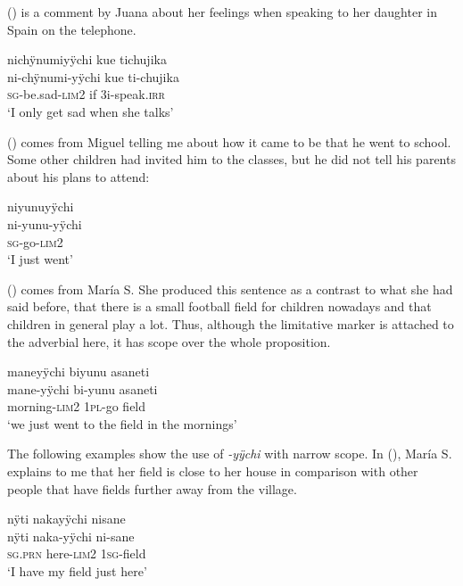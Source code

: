 () is a comment by Juana about her feelings when speaking to her daughter in Spain on the telephone.

\ea\label{ex:lim2-1}
\begingl
\glpreamble nichÿnumiyÿchi kue tichujika\\
\gla ni-chÿnumi-yÿchi kue ti-chujika\\
\textsc{sg}-be.sad-\textsc{lim}2 if 3i-speak.\textsc{irr}\\
\glft ‘I only get sad when she talks’
\endgl
\trailingcitation{[jxx-p120430l-1.307]}
\xe

() comes from Miguel telling me about how it came to be that he went to school. Some other children had invited him to the classes, but he did not tell his parents about his plans to attend:

\ea\label{ex:lim2-4}
\begingl
\glpreamble niyunuyÿchi\\
\gla ni-yunu-yÿchi\\
\textsc{sg}-go-\textsc{lim}2\\
\glft ‘I just went’
\endgl
\trailingcitation{[mxx-p181027l-1.016]}
\xe

() comes from María S. She produced this sentence as a contrast to what she had said before, that there is a small football field for children nowadays and that children in general play a lot. Thus, although the limitative marker is attached to the adverbial here, it has scope over the whole proposition.

\ea\label{ex:lim-2-3}
\begingl
\glpreamble maneyÿchi biyunu asaneti\\
\gla mane-yÿchi bi-yunu asaneti\\
\glb morning-\textsc{lim}2 1\textsc{pl}-go field\\
\glft ‘we just went to the field in the mornings’
\endgl
\trailingcitation{[rxx-p181101l-2.147]}
\xe

The following examples show the use of \textit{-yÿchi} with narrow scope. In (), María S. explains to me that her field is close to her house in comparison with other people that have fields further away from the village.

\ea\label{ex:lim2-2}
\begingl
\glpreamble nÿti nakayÿchi nisane\\
\gla nÿti naka-yÿchi ni-sane\\
\textsc{sg.prn} here-\textsc{lim}2 1\textsc{sg}-field\\
\glft ‘I have my field just here’
\endgl
\trailingcitation{[rxx-e120511l.399]}%
\xe


